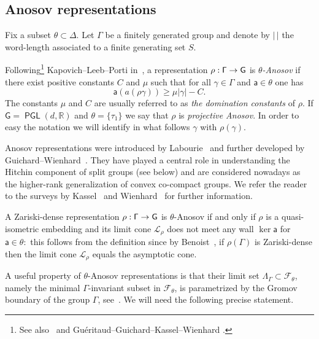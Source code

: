 \documentclass[AHL,Unicode,longabstracts,MathTools]{cedram}
\newcommand{\cartan}{a}
\DeclareMathOperator{\PGL}{{\mathsf{PGL}}}
\renewcommand{\sf}[1]{{\mathsf{#1}}}
\newcommand{\sroot}{{\sf{a}}}
\newcommand{\sfG}{\sf{G}}
\newcommand{\G}{\sf{\Gamma}}
\newcommand{\calF}{\mathcal{F}}
\newcommand{\calL}{\mathcal{L}}
\newcommand{\R}{\mathbb{R}}
\newcommand{\g}{\gamma}
\renewcommand{\t}{\theta}
\newcommand{\simple}{{\sf \Delta}}
\newcommand{\slroot}{{\tau}}
\renewcommand{\/}{\backslash}
\newcommand{\<}{\langle}
\renewcommand{\>}{\rangle}
\renewcommand*{\to}{\mathchoice{\longrightarrow}{\rightarrow}{\rightarrow}{\rightarrow}}
\begin{document}
\subsection{Anosov representations}\label{s.Anosov}
Fix a subset $\t\subset\simple$. Let $\G$ be a finitely generated group and denote by $|\,|$ the word-length associated to a finite generating set $S$.

\begin{defi}\label{AnosovDefi}
Following\footnote{
See also~\cite{BPS} and Guéritaud--Guichard--Kassel--Wienhard
\cite{GGKW}.
} Kapovich--Leeb--Porti in~\cite{KLP}, a representation $\rho:\G\to\sfG$ is \emph{$\t$-Anosov} if there exist positive constants $C$ and $\mu$ such that for all $\g\in\G$ and $\sroot\in\t$ one has
\[
\sroot(\cartan(\rho\g))\geq \mu|\g|-C.
\]
The constants $\mu$ and $C$ are usually referred to as \emph{the domination constants} of $\rho$.
If $\sfG=\PGL(d,\R)$ and $\t=\{\slroot_1\}$ we say that $\rho$ is \emph{projective Anosov}. In order to easy the notation we will identify in what follows $\g$ with $\rho(\g)$.
\end{defi}



Anosov representations were introduced by Labourie~\cite{labourie} and further developed by Guichard--Wienhard~\cite{GW}. They have played a central role in understanding the Hitchin component of split groups (see below) and are considered nowadays as the higher-rank generalization of convex co-compact groups. We refer the reader to the surveys by Kassel~\cite{FannyICM18} and Wienhard~\cite{Anna-ICM} for further information.


\begin{rema}\label{wallsAnosov}
A Zariski-dense representation $\rho:\G\to\sfG$ is $\t$-Anosov if and only if $\rho$ is a quasi-isometric embedding and its limit cone $\calL_\rho$ does not meet any wall $\ker\sroot$ for $\sroot\in\t:$ this follows from the definition since by Benoist~\cite{limite}, if $\rho(\G)$ is Zariski-dense then the limit cone $\calL_\rho$ equals the asymptotic cone.
\end{rema}



A useful property of $\t$-Anosov representations is that their limit set $\Lambda_\G\subset \calF_{\theta}$, namely the minimal $\G$-invariant subset in $\calF_{\theta}$, is parametrized by the Gromov boundary of the group $\G$, see~\cite{GGKW,KLP}.
We will need the following precise statement.
\end{document}
